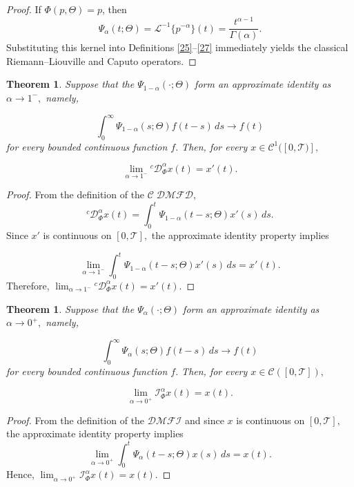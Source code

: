 \documentclass[11pt]{article}
\numberwithin{equation}{section}
\newtheorem{theorem}[definition]{Theorem}
\begin{document}
\begin{proof}
If $\Phi(p,\Theta)=p$, then
\[
\Psi_\alpha(t;\Theta)
=
\mathcal L^{-1}\{p^{-\alpha}\}(t)
=
\frac{t^{\alpha-1}}{\Gamma(\alpha)}.
\]
Substituting this kernel into Definitions \ref{25}--\ref{27} immediately yields the classical Riemann--Liouville and Caputo operators.
\end{proof}


\begin{theorem}
Suppose that the 
\(
\Psi_{1-\alpha}(\cdot;\Theta)
\)
form an approximate identity as
\(
\alpha\to1^-,
\)
namely,

\[
\int_0^\infty
\Psi_{1-\alpha}(s;\Theta)
f(t-s)
\,ds
\longrightarrow
f(t)
\]
for every bounded continuous function
\(
f.
\)
Then, for every
\(
x\in \mathcal{C}^1([0,\mathcal{T})],
\)

\[
\lim_{\alpha\to1^-}
{}^c \mathcal D_\Phi^\alpha x(t)
=
x'(t).
\]

\end{theorem}

\begin{proof}
From the definition of the $\mathcal{C\;DMFD}$,
\[
{}^c \mathcal D_\Phi^\alpha x(t)
=
\int_0^t
\Psi_{1-\alpha}(t-s;\Theta)
x'(s)
\,ds.
\]
Since
\(
x'
\)
is continuous on
\(
[0,\mathcal{T}],
\)
the approximate identity property implies

\[
\lim_{\alpha\to1^-}
\int_0^t
\Psi_{1-\alpha}(t-s;\Theta)
x'(s)
\,ds
=
x'(t).
\]
Therefore,
\(
\lim_{\alpha\to1^-}
{}^c \mathcal D_\Phi^\alpha x(t)
=
x'(t).
\)
\end{proof}

\begin{theorem}
Suppose that the 
\(
\Psi_\alpha(\cdot;\Theta)
\)
form an approximate identity as
\(
\alpha\to0^+,
\)
namely,

\[
\int_0^\infty
\Psi_\alpha(s;\Theta)
f(t-s)
\,ds
\to
f(t)
\]
for every bounded continuous function
\(
f.
\)
Then, for every
\(
x\in \mathcal C([0,\mathcal{T}]),
\)

\[
\lim_{\alpha\to0^+}
\mathcal I_\Phi^\alpha x(t)
=
x(t).
\]

\end{theorem}

\begin{proof}
From the definition of the $\mathcal{DMFI}$
and since
\(
x
\)
is continuous on
\(
[0,\mathcal{T}],
\)
the approximate identity property implies
\[
\lim_{\alpha\to0^+}
\int_0^t
\Psi_\alpha(t-s;\Theta)
x(s)
\,ds
=
x(t).
\]
Hence,
\(
\lim_{\alpha\to0^+}
\mathcal I_\Phi^\alpha x(t)
=
x(t).
\)


\end{proof}
\end{document}
